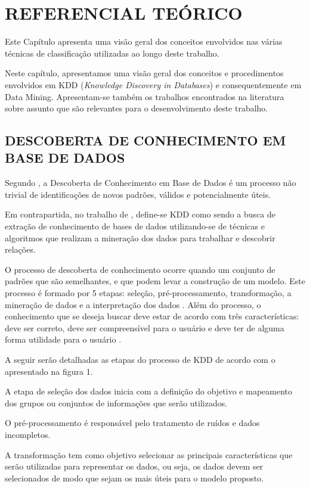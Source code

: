 \documentclass[
	12pt,				%
	openright,			%
	oneside,	
	a4paper,				%
	english,				%
	brazil				%
]{abntex2/abntex2} %
\begin{document}
\chapter{REFERENCIAL TEÓRICO}

Este Capítulo apresenta uma visão geral dos conceitos envolvidos nas várias técnicas de classificação utilizadas ao longo deste trabalho.

Neste capítulo, apresentamos uma visão geral dos conceitos e procedimentos envolvidos em KDD (\textit{Knowledge Discovery in Databases}) e consequentemente em Data Mining. Apresentam-se também os trabalhos encontrados na literatura sobre assunto que são relevantes para o desenvolvimento deste trabalho.

	\section{DESCOBERTA DE CONHECIMENTO EM BASE DE DADOS}
	
	Segundo \cite{fayyad:1996}, a Descoberta de Conhecimento em Base de Dados é um processo não trivial de identificações de novos padrões, válidos e potencialmente úteis.
	
	Em contrapartida, no trabalho de \cite{thome:2002}, define-se KDD como sendo a busca de extração de conhecimento de bases de dados utilizando-se de técnicas e algoritmos que realizam a mineração dos dados para trabalhar e descobrir relações.
	
	O processo de descoberta de conhecimento ocorre quando um conjunto de padrões que são semelhantes, e que podem levar a construção de um modelo. Este processo é formado por 5 etapas: seleção, pré-processamento, transformação, a mineração de dados e a interpretação dos dados \cite{fayyad:1996}. Além do processo, o conhecimento que se deseja buscar deve estar de acordo com três características: deve ser correto, deve ser compreensível para o usuário e deve ter de alguma forma utilidade para o usuário \cite{freitas:2000}.
	
	A seguir serão detalhadas as etapas do processo de KDD de acordo com o apresentado na figura 1.
	
	A etapa de seleção dos dados inicia com a definição do objetivo e mapeamento  dos grupos ou conjuntos de informações que serão utilizados.
	
	O pré-processamento é responsável pelo tratamento de ruídos e dados incompletos.
	
	A transformação tem como objetivo selecionar as principais características que serão utilizadas para representar os dados, ou seja, os dados devem ser selecionados de  modo que sejam os mais úteis para o modelo proposto.
	
\end{document}
